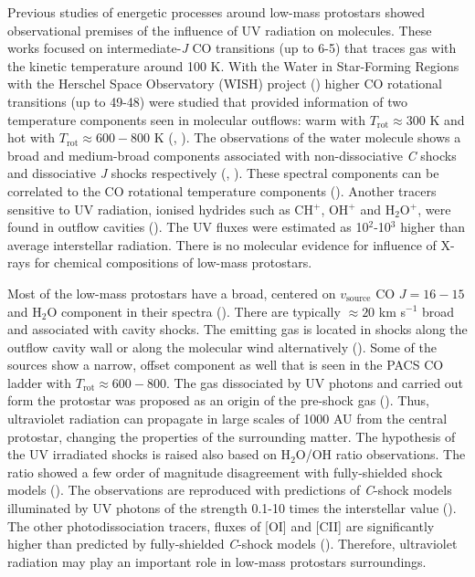 \documentclass{aa}
\begin{document}

Previous studies of energetic processes around low-mass protostars showed observational premises of
the influence of UV radiation on molecules. These works focused on intermediate-\textit{J} CO
transitions (up to 6-5) that traces gas with the kinetic temperature around 100 K. With the Water in
Star-Forming Regions with the Herschel Space Observatory (WISH) project (\citealt{vDi11}) higher CO
rotational transitions (up to 49-48) were studied that provided information of two temperature
components seen in molecular outflows: warm with $T_\mathrm{rot} \approx 300$ K and hot with
$T_\mathrm{rot} \approx 600-800$ K (\citealt{Kar13}, \citealt{Gre13}). The observations of the water
molecule shows a broad and medium-broad components associated with non-dissociative \textit{C}
shocks and dissociative \textit{J} shocks respectively (\citealt{Kri13}, \citealt{Mot14}). These
spectral components can be correlated to the CO rotational temperature components (\citealt{Kri17}).
Another tracers sensitive to UV radiation, ionised hydrides such as CH$^+$, OH$^+$ and H$_2$O$^+$,
were found in outflow cavities (\citealt{Ben16}). The UV fluxes were estimated as 10$^2$-10$^3$
higher than average interstellar radiation. There is no molecular evidence for influence of X-rays
for chemical compositions of low-mass protostars.

Most of the low-mass protostars have a broad, centered on $v_{\mathrm{source}}$ CO $J=16-15$ and
H$_2$O component in their spectra (\citealt{Kri17}). There are typically $\approx 20$ km s$^{-1}$
broad and associated with cavity shocks. The emitting gas is located in shocks along the outflow
cavity wall or along the molecular wind alternatively (\citealt{Yva16}). Some of the sources show a
narrow, offset component as well that is seen in the PACS CO ladder with $T_\mathrm{rot} \approx
600-800$. The gas dissociated by UV photons and carried out form the protostar was proposed as an
origin of the pre-shock gas (\citealt{Kri17}). Thus, ultraviolet radiation can propagate in large
scales of 1000 AU from the central protostar, changing the properties of the surrounding matter. The
hypothesis of the UV irradiated shocks is raised also based on H$_2$O/OH ratio observations. The
ratio showed a few order of magnitude disagreement with fully-shielded shock models
(\citealt{Kar14}). The observations are reproduced with predictions of \textit{C}-shock models
illuminated by UV photons of the strength 0.1-10 times the interstellar value (\citealt{Mel15}). The
other photodissociation tracers, fluxes of [OI] and [CII] are significantly higher than predicted by
fully-shielded \textit{C}-shock models (\citealt{Kar18}). Therefore, ultraviolet radiation may play
an important role in low-mass protostars surroundings.
\end{document}
